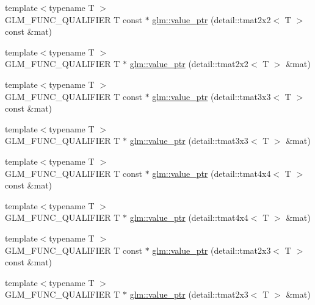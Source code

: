 \begin{DoxyCompactItemize}
\item 
{\footnotesize template$<$typename T $>$ }\\G\+L\+M\+\_\+\+F\+U\+N\+C\+\_\+\+Q\+U\+A\+L\+I\+F\+I\+E\+R T const $\ast$ \hyperlink{group__gtc__type__ptr_gabc0ecc372916bebbd130341cb0799376}{glm\+::value\+\_\+ptr} (detail\+::tmat2x2$<$ T $>$ const \&mat)
\item 
{\footnotesize template$<$typename T $>$ }\\G\+L\+M\+\_\+\+F\+U\+N\+C\+\_\+\+Q\+U\+A\+L\+I\+F\+I\+E\+R T $\ast$ \hyperlink{group__gtc__type__ptr_ga09141ef8c41ab15f7989b620e748ae3c}{glm\+::value\+\_\+ptr} (detail\+::tmat2x2$<$ T $>$ \&mat)
\item 
{\footnotesize template$<$typename T $>$ }\\G\+L\+M\+\_\+\+F\+U\+N\+C\+\_\+\+Q\+U\+A\+L\+I\+F\+I\+E\+R T const $\ast$ \hyperlink{group__gtc__type__ptr_ga23b2a53a00923f747637fc271f78e9db}{glm\+::value\+\_\+ptr} (detail\+::tmat3x3$<$ T $>$ const \&mat)
\item 
{\footnotesize template$<$typename T $>$ }\\G\+L\+M\+\_\+\+F\+U\+N\+C\+\_\+\+Q\+U\+A\+L\+I\+F\+I\+E\+R T $\ast$ \hyperlink{group__gtc__type__ptr_ga2cadd2b9a774d77c66e8f723b729c4e7}{glm\+::value\+\_\+ptr} (detail\+::tmat3x3$<$ T $>$ \&mat)
\item 
{\footnotesize template$<$typename T $>$ }\\G\+L\+M\+\_\+\+F\+U\+N\+C\+\_\+\+Q\+U\+A\+L\+I\+F\+I\+E\+R T const $\ast$ \hyperlink{group__gtc__type__ptr_ga1e7076c8387f3e7436a00453a1f5fe5e}{glm\+::value\+\_\+ptr} (detail\+::tmat4x4$<$ T $>$ const \&mat)
\item 
{\footnotesize template$<$typename T $>$ }\\G\+L\+M\+\_\+\+F\+U\+N\+C\+\_\+\+Q\+U\+A\+L\+I\+F\+I\+E\+R T $\ast$ \hyperlink{group__gtc__type__ptr_gadc0d39ee1a6b84a4337840746649cca3}{glm\+::value\+\_\+ptr} (detail\+::tmat4x4$<$ T $>$ \&mat)
\item 
{\footnotesize template$<$typename T $>$ }\\G\+L\+M\+\_\+\+F\+U\+N\+C\+\_\+\+Q\+U\+A\+L\+I\+F\+I\+E\+R T const $\ast$ \hyperlink{group__gtc__type__ptr_ga7a07a13118bdceeaef82e330f8f47fcf}{glm\+::value\+\_\+ptr} (detail\+::tmat2x3$<$ T $>$ const \&mat)
\item 
{\footnotesize template$<$typename T $>$ }\\G\+L\+M\+\_\+\+F\+U\+N\+C\+\_\+\+Q\+U\+A\+L\+I\+F\+I\+E\+R T $\ast$ \hyperlink{group__gtc__type__ptr_gac99ce6d08fb5b645d543ea875567ea3b}{glm\+::value\+\_\+ptr} (detail\+::tmat2x3$<$ T $>$ \&mat)

\end{DoxyCompactItemize}
